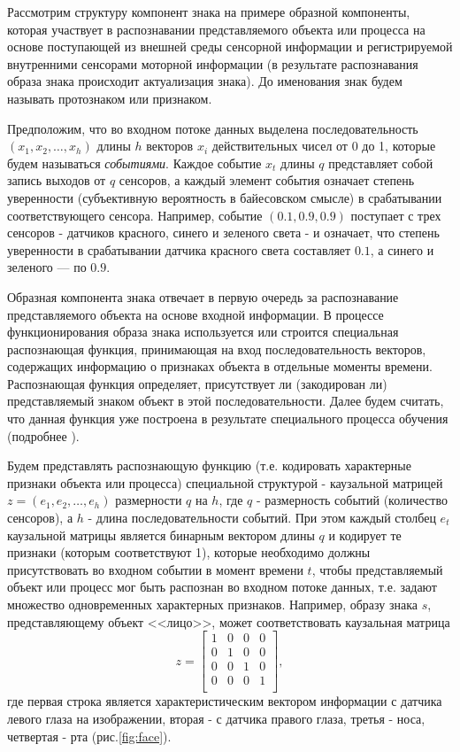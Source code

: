 \documentclass[12pt]{scrartcl}
\begin{document}
	Рассмотрим структуру компонент знака на примере образной компоненты, которая участвует в распознавании представляемого объекта или процесса на основе поступающей из внешней среды сенсорной информации и регистрируемой внутренними сенсорами моторной информации (в результате распознавания образа знака происходит актуализация знака). До именования знак будем называть протознаком или признаком.
	
	Предположим, что во входном потоке данных выделена последовательность $(x_1,x_2,\dots,x_h)$ длины $h$ векторов $x_i$ действительных чисел от 0 до 1, которые будем называться \textit{событиями}. Каждое событие $x_t$ длины $q$ представляет собой запись выходов от $q$ сенсоров, а каждый элемент события означает степень уверенности (субъективную вероятность в байесовском смысле) в срабатывании соответствующего сенсора. Например, событие $(0.1, 0.9, 0.9)$ поступает с трех сенсоров - датчиков красного, синего и зеленого света - и означает, что степень уверенности в срабатывании датчика красного света составляет $0.1$, а синего и зеленого --- по $0.9$.
	
	Образная компонента знака отвечает в первую очередь за распознавание представляемого объекта на основе входной информации. В процессе функционирования образа знака используется или строится специальная распознающая функция, принимающая на вход последовательность векторов, содержащих информацию о признаках объекта в отдельные моменты времени. Распознающая функция определяет, присутствует ли (закодирован ли) представляемый знаком объект в этой последовательности. Далее будем считать, что данная функция уже построена в результате специального процесса обучения (подробнее \cite{Panov2014d,Skrynnik2016}).
	
	Будем представлять распознающую функцию (т.е. кодировать характерные признаки объекта или процесса) специальной структурой - каузальной матрицей $z=(e_1,e_2,\dots,e_h)$ размерности $q$ на $h$, где $q$ - размерность событий (количество сенсоров), а $h$ - длина последовательности событий. При этом каждый столбец $e_t$ каузальной матрицы является бинарным вектором длины $q$ и кодирует те признаки (которым соответствуют 1), которые необходимо должны присутствовать во входном событии в момент времени $t$, чтобы представляемый объект или процесс мог быть распознан во входном потоке данных, т.е. задают множество одновременных характерных признаков. Например, образу знака $s$, представляющему объект <<лицо>>, может соответствовать каузальная матрица 	
	\[
		z=\begin{bmatrix}
			1 & 0 & 0 & 0\\
			0 & 1 & 0 & 0\\
			0 & 0 & 1 & 0\\
			0 & 0 & 0 & 1\\
		\end{bmatrix},
	\]
	где первая строка является характеристическим вектором информации с датчика левого глаза на изображении, вторая - с датчика правого глаза, третья - носа, четвертая - рта (рис.\ref{fig:face}).
\end{document}
